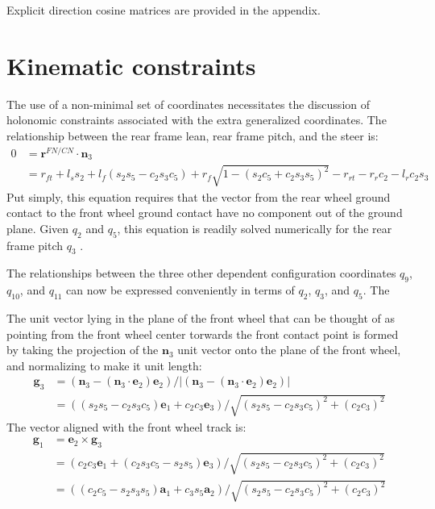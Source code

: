 \documentclass[letterpaper,11pt]{article}
\newcommand{\bs}[1]{ \boldsymbol{ #1 } }
\begin{document}
Explicit direction cosine matrices are provided in the
appendix.

\section*{Kinematic constraints}
The use of a non-minimal set of coordinates necessitates the discussion of
holonomic constraints associated with the extra generalized coordinates.  The
relationship between the rear frame lean, rear frame pitch, and the steer is:
\begin{align*}
0 & =  \bs{r}^{FN/CN} \cdot \bs{n}_3 \\
  & = r_{ft} + l_s s_2 + l_f (s_2 s_5 - c_2 s_3 c_5) +
    r_f \sqrt{1 - (s_2 c_5 + c_2 s_3 s_5)^2} - r_{rt} - r_r c_2 - l_r c_2 s_3
  \label{eq:holonomic}
\end{align*}
Put simply, this equation requires that the vector from the rear wheel ground
contact to the front wheel ground contact have no component out of the ground
plane.  Given $q_2$ and $q_5$, this equation is readily solved numerically for
the rear frame pitch $q_3$ \cite{Peterson2008a}.

The relationships between the three other dependent configuration coordinates
$q_9$, $q_{10}$, and $q_{11}$ can now be expressed conveniently in terms of
$q_2$, $q_3$, and $q_5$.  The

The unit vector lying in the plane of the front wheel that
can be thought of as pointing from the front wheel center torwards the front
contact point is formed by taking the projection of the $\bs{n}_3$ unit vector
onto the plane of the front wheel, and normalizing to make it unit length:
\begin{align*}
  \bs{g}_3 & = (\bs{n}_3 - (\bs{n}_3 \cdot \bs{e}_2) \bs{e}_2) / |(\bs{n}_3 -
  (\bs{n}_3 \cdot \bs{e}_2) \bs{e}_2)| \\
  & = ((s_2 s_5 - c_2 s_3 c_5) \bs{e}_1 + c_2 c_3 \bs{e}_3) / \sqrt{(s_2 s_5 -
  c_2 s_3 c_5)^2 + (c_2 c_3)^2}
\end{align*}
The vector aligned with the front wheel track is:
\begin{align*}
  \bs{g}_1 & = \bs{e}_2 \times \bs{g}_3 \\
  & = \left(c_2 c_3 \bs{e}_1 + (c_2 s_3 c_5 - s_2 s_5) \bs{e}_3\right) / \sqrt{(s_2 s_5 -
  c_2 s_3 c_5)^2 + (c_2 c_3)^2} \\
  & = \left((c_2 c_5 - s_2 s_3 s_5) \bs{a}_1 + c_3 s_5 \bs{a}_2\right) / \sqrt{(s_2 s_5 -
  c_2 s_3 c_5)^2 + (c_2 c_3)^2}
\end{align*}
\end{document}
